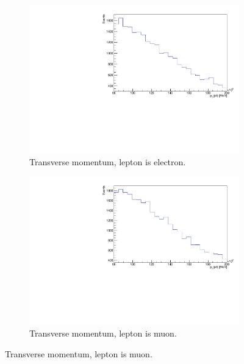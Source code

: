 \begin{figure}[H]%
  \begin{subfigure}{0.48\textwidth}%
    \centering%
    \includegraphics[width=\textwidth]{plots/ttbar_distributions/ttbar.el_jet_pt_max.pdf}%
    \caption{Transverse momentum, lepton is electron.}%
    \label{fig:4a}%
  \end{subfigure}%
  \hfill
  \begin{subfigure}{0.48\textwidth}%
    \centering%
    \includegraphics[width=\textwidth]{plots/ttbar_distributions/ttbar.mu_jet_pt_max.pdf}%
    \caption{Transverse momentum, lepton is muon.}%
    \label{fig:4b}%
  \end{subfigure}%


\end{figure}
